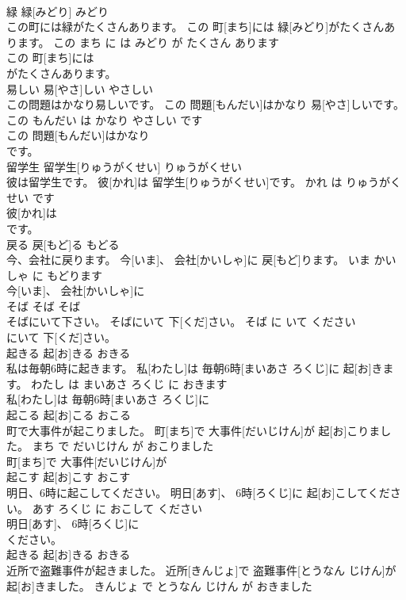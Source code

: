 \documentclass[8pt]{extreport}
\begin{document}
\begin{CJK}{UTF8}{min}
\\	緑	緑[みどり]	みどり	
\\	この町には緑がたくさんあります。	この 町[まち]には 緑[みどり]がたくさんあります。	この まち に は みどり が たくさん あります	
\\	この 町[まち]には
\\	がたくさんあります。			
\\	易しい	易[やさ]しい	やさしい	
\\	この問題はかなり易しいです。	この 問題[もんだい]はかなり 易[やさ]しいです。	この もんだい は かなり やさしい です	
\\	この 問題[もんだい]はかなり
\\	です。			
\\	留学生	留学生[りゅうがくせい]	りゅうがくせい	
\\	彼は留学生です。	彼[かれ]は 留学生[りゅうがくせい]です。	かれ は りゅうがくせい です	
\\	彼[かれ]は
\\	です。			
\\	戻る	戻[もど]る	もどる	
\\	今、会社に戻ります。	今[いま]、 会社[かいしゃ]に 戻[もど]ります。	いま かいしゃ に もどります	
\\	今[いま]、 会社[かいしゃ]に
\\	そば	そば	そば	
\\	そばにいて下さい。	そばにいて 下[くだ]さい。	そば に いて ください	
\\	にいて 下[くだ]さい。			
\\	起きる	起[お]きる	おきる	
\\	私は毎朝6時に起きます。	私[わたし]は 毎朝6時[まいあさ ろくじ]に 起[お]きます。	わたし は まいあさ ろくじ に おきます	
\\	私[わたし]は 毎朝6時[まいあさ ろくじ]に
\\	起こる	起[お]こる	おこる	
\\	町で大事件が起こりました。	町[まち]で 大事件[だいじけん]が 起[お]こりました。	まち で だいじけん が おこりました	
\\	町[まち]で 大事件[だいじけん]が
\\	起こす	起[お]こす	おこす	
\\	明日、6時に起こしてください。	明日[あす]、 6時[ろくじ]に 起[お]こしてください。	あす ろくじ に おこして ください	
\\	明日[あす]、 6時[ろくじ]に
\\	ください。			
\\	起きる	起[お]きる	おきる	
\\	近所で盗難事件が起きました。	近所[きんじょ]で 盗難事件[とうなん じけん]が 起[お]きました。	きんじょ で とうなん じけん が おきました	

\end{CJK}
\end{document}
